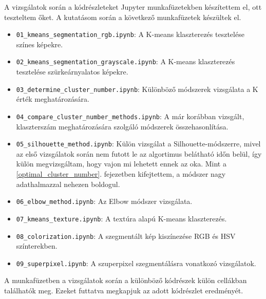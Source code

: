 
A vizsgálatok során a kódrészleteket Jupyter munkafüzetekben készítettem el, ott teszteltem őket. A kutatásom során a következő munkafüzetek készültek el.
\begin{itemize}
\item \texttt{01\_kmeans\_segmentation\_rgb.ipynb}: A K-means klaszterezés tesztelése színes képekre.
\item \texttt{02\_kmeans\_segmentation\_grayscale.ipynb}: A K-means klaszterezés tesztelése szürkeárnyalatos képekre.
\item \texttt{03\_determine\_cluster\_number.ipynb}: Különböző módszerek vizsgálata a K érték meghatározására.
\item \texttt{04\_compare\_cluster\_number\_methods.ipynb}: A már korábban vizsgált, klaszterszám meghatározására szolgáló módszerek összehasonlítása.
\item \texttt{05\_silhouette\_method.ipynb}: Külön vizsgálat a Silhouette-módszerre, mivel az első vizsgálatok során nem futott le az algortimus belátható időn belül, így külön megvizsgáltam, hogy vajon mi lehetett ennek az oka. Mint a \ref{optimal_cluster_number}. fejezetben kifejtettem, a módszer nagy adathalmazzal nehezen boldogul.
\item \texttt{06\_elbow\_method.ipynb}: Az Elbow módszer vizsgálata.
\item \texttt{07\_kmeans\_texture.ipynb}: A textúra alapú K-means klaszterezés.
\item \texttt{08\_colorization.ipynb}: A szegmentált kép kiszínezése RGB és HSV színterekben.
\item \texttt{09\_superpixel.ipynb}: A szuperpixel szegmentálásra vonatkozó vizsgálatok. 
\end{itemize}

A munkafüzetben a vizsgálatok során a különböző kódrészek külön cellákban találhatók meg. Ezeket futtatva megkapjuk az adott kódrészlet eredményét. 